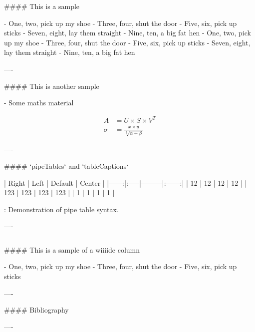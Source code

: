 \documentclass{beamer}
\begin{document}
\begin{frame}[fragile]
\begin{columns}[T]
\begin{column}{.46\textwidth}
\begin{markdown}

#### This is a sample

- One, two, pick up my shoe
- Three, four, shut the door
- Five, six, pick up sticks
- Seven, eight, lay them straight
- Nine, ten, a big fat hen
- One, two, pick up my shoe
- Three, four, shut the door
- Five, six, pick up sticks
- Seven, eight, lay them straight
- Nine, ten, a big fat hen

----

#### This is another sample

- Some maths material

\begin{align}
A &= U \times S \times V^T\\
\sigma &= \frac{x\times y}{\sqrt[3]{\alpha + \beta}}
\end{align}

----


#### `pipeTables` and `tableCaptions`

| Right | Left | Default | Center |
|------:|:-----|---------|:------:| 
|  12   |  12  |  12     |   12   | 
| 123   |  123 |   123   |  123   | 
|   1   |    1 |     1   |    1   | 

  : Demonstration of pipe table syntax.

----

\end{markdown}
\end{column}
\end{columns}

\begin{markdown}

#### This is a sample of a wiiiide column

- One, two, pick up my shoe
- Three, four, shut the door
- Five, six, pick up sticks

----

#### Bibliography




----

\end{markdown}

\end{frame}
\end{document}

